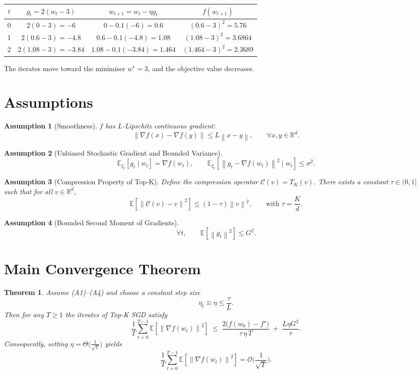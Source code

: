 \documentclass{article}
\newtheorem{theorem}{Theorem}
\newtheorem{assumption}{Assumption}
\newcommand{\E}{\mathbb{E}}
\newcommand{\R}{\mathbb{R}}
\newcommand{\norm}[1]{\left\|#1\right\|}
\begin{document}
\begin{center}
\begin{tabular}{c|c|c|c}
$t$ & $g_{t}=2(w_{t}-3)$ & $w_{t+1}=w_{t}-\eta g_{t}$ & $f(w_{t+1})$\\\hline
0 & $2(0-3)=-6$ & $0-0.1(-6)=0.6$ & $(0.6-3)^{2}=5.76$\\
1 & $2(0.6-3)=-4.8$ & $0.6-0.1(-4.8)=1.08$ & $(1.08-3)^{2}=3.6864$\\
2 & $2(1.08-3)=-3.84$ & $1.08-0.1(-3.84)=1.464$ & $(1.464-3)^{2}=2.3689$
\end{tabular}
\end{center}
The iterates move toward the minimiser $w^{\star}=3$, and the objective value decreases.

\newpage
\section*{Assumptions}
\begin{assumption}[Smoothness]
$f$ has $L$‑Lipschitz continuous gradient:
\[
\norm{\nabla f(x)-\nabla f(y)}\le L\norm{x-y},\qquad\forall x,y\in\R^{d}.
\tag{A1}
\]
\end{assumption}

\begin{assumption}[Unbiased Stochastic Gradient and Bounded Variance]
\[
\E_{\xi_{t}}\!\left[g_{t}\mid w_{t}\right]=\nabla f(w_{t}),\qquad
\E_{\xi_{t}}\!\left[\norm{g_{t}-\nabla f(w_{t})}^{2}\mid w_{t}\right]\le\sigma^{2}.
\tag{A2}
\]
\end{assumption}

\begin{assumption}[Compression Property of Top‑K]
Define the compression operator $\mathcal{C}(v)=T_{K}(v)$.  
There exists a constant $\tau\in(0,1]$ such that for all $v\in\R^{d}$,
\[
\E\!\left[\norm{\mathcal{C}(v)-v}^{2}\right]\le (1-\tau)\norm{v}^{2},
\qquad\text{with }\tau=\frac{K}{d}.
\tag{A3}
\]
\end{assumption}

\begin{assumption}[Bounded Second Moment of Gradients]
\[
\forall t,\qquad \E\!\left[\norm{g_{t}}^{2}\right]\le G^{2}.
\tag{A4}
\]
\end{assumption}

\section*{Main Convergence Theorem}
\begin{theorem}
\label{thm:main}
Assume (A1)–(A4) and choose a constant step size
\[
\eta_{t}\equiv\eta\le\frac{\tau}{L}.
\]
Then for any $T\ge1$ the iterates of Top‑K SGD satisfy
\[
\frac{1}{T}\sum_{t=0}^{T-1}\E\!\left[\norm{\nabla f(w_{t})}^{2}\right]
\;\le\;
\frac{2\big(f(w_{0})-f^{\star}\big)}{\tau\,\eta\,T}
\;+\;
\frac{L\eta G^{2}}{\tau}.
\tag{2}
\]
Consequently, setting $\eta=\Theta\!\big(\frac{1}{\sqrt{T}}\big)$ yields
\[
\frac{1}{T}\sum_{t=0}^{T-1}\E\!\left[\norm{\nabla f(w_{t})}^{2}\right]=\mathcal{O}\!\Big(\frac{1}{\sqrt{T}}\Big).
\]
\end{theorem}
\end{document}
